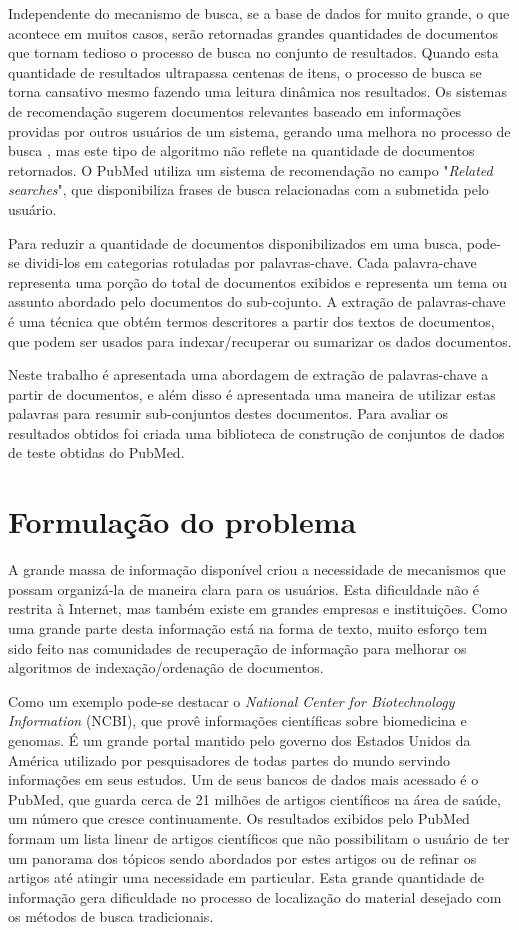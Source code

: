 Independente do mecanismo de busca, se a base de dados for muito grande, o que acontece em muitos casos, serão retornadas grandes quantidades de documentos que tornam tedioso o processo de busca no conjunto de resultados. Quando esta quantidade de resultados ultrapassa centenas de itens, o processo de busca se torna cansativo mesmo fazendo uma leitura dinâmica nos resultados. Os sistemas de recomendação sugerem documentos relevantes baseado em informações providas por outros usuários de um sistema, gerando uma melhora no processo de busca \cite{Jannach2010}, mas este tipo de algoritmo não reflete na quantidade de documentos retornados. O PubMed utiliza um sistema de recomendação no campo "\emph{Related searches}", que disponibiliza frases de busca relacionadas com a submetida pelo usuário.

Para reduzir a quantidade de documentos disponibilizados em uma busca, pode-se dividi-los em categorias rotuladas por palavras-chave. Cada palavra-chave representa uma porção do total de documentos exibidos e representa um tema ou assunto abordado pelo documentos do sub-cojunto. A extração de palavras-chave é uma técnica que obtém termos descritores a partir dos textos de documentos, que podem ser usados para indexar/recuperar ou sumarizar os dados documentos.

Neste trabalho é apresentada uma abordagem de extração de palavras-chave a partir de documentos, e além disso é apresentada uma maneira de utilizar estas palavras para resumir sub-conjuntos destes documentos. Para avaliar os resultados obtidos foi criada uma biblioteca de construção de conjuntos de dados de teste obtidas do PubMed.

\section{Formulação do problema}
A grande massa de informação disponível criou a necessidade de mecanismos que possam organizá-la de maneira clara para os usuários. Esta dificuldade não é restrita à Internet, mas também existe em grandes empresas e instituições. Como uma grande parte desta informação está na forma de texto, muito esforço tem sido feito nas comunidades de recuperação de informação para melhorar os algoritmos de indexação/ordenação de documentos.

Como um exemplo pode-se destacar o \emph{National Center for Biotechnology Information} (NCBI), que provê informações científicas sobre biomedicina e genomas. É um grande portal mantido pelo governo dos Estados Unidos da América utilizado por pesquisadores de todas partes do mundo servindo informações em seus estudos. Um de seus bancos de dados mais acessado é o PubMed, que guarda cerca de 21 milhões de artigos científicos na área de saúde, um número que cresce continuamente. Os resultados exibidos pelo PubMed formam um lista linear de artigos científicos que não possibilitam o usuário de ter um panorama dos tópicos sendo abordados por estes artigos ou de refinar os artigos até atingir uma necessidade em particular. Esta grande quantidade de informação gera dificuldade no processo de localização do material desejado com os métodos de busca tradicionais.

